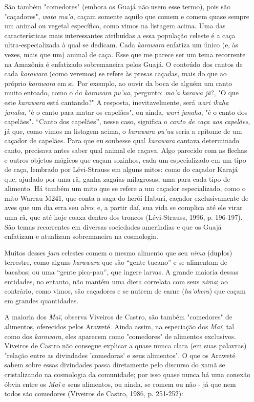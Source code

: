 São também "comedores" (embora os Guajá não usem esse termo), pois são
"caçadores", \emph{wata ma'a}, caçam somente aquilo que comem e comem
quase sempre um animal ou vegetal específico, como vimos na listagem
acima. Uma das características mais interessantes atribuídas a essa
população celeste é a caça ultra-especializada à qual se dedicam. Cada
\emph{karawara} enfatiza um único (e, às vezes, mais que um) animal de
caça. Esse que me parece ser um tema recorrente na Amazônia é enfatizado
sobremaneira pelos Guajá. O conteúdo dos cantos de cada \emph{karawara}
(como veremos) se refere às presas caçadas, mais do que ao próprio
\emph{karawara} em si. Por exemplo, ao ouvir da boca de alguém um canto
muito entoado, como o do \emph{karawara} \emph{pu'ua}, pergunto:
\emph{ma'a karawa} \emph{jã}?, "O que este \emph{karawara} está
cantando?" A resposta, inevitavelmente, será \emph{wari ikaha}
\emph{janaha}, "é o canto para matar os capelães", ou ainda, \emph{wari}
\emph{janaha}, "é o canto dos capelães". ``Canto dos capelães'', nesse
caso, significa o \emph{canto de caça aos capelães}, já que, como vimos
na listagem acima, o \emph{karawara} \emph{pu'ua} seria a epítome de um
caçador de capelães. Para que eu soubesse qual \emph{karawara} cantava
determinado canto, precisava antes saber qual animal ele caçava. Algo
parecido com as flechas e outros objetos mágicos que caçam sozinhos,
cada um especializado em um tipo de caça, lembrado por Lévi-Strauss em
alguns mitos: como do caçador Karajá que, ajudado por uma rã, ganha
zagaias milagrosas, uma para cada tipo de alimento. Há também um mito
que se refere a um caçador especializado, como o mito Warrau M241, que
conta a saga do herói Haburi, caçador exclusivamente de aves que um dia
erra seu alvo; e, a partir daí, sua vida se complica até ele virar uma
rã, que até hoje coaxa dentro dos troncos (Lévi-Strauss, 1996, p.
196-197). São temas recorrentes em diversas sociedades ameríndias e que
os Guajá enfatizam e atualizam sobremaneira na cosmologia.

Muitos desses \emph{jara} celestes comem o mesmo alimento que seu
\emph{nima} (duplos) terrestre, como alguns \emph{karawara} que são
``gente tucano'' e se alimentam de bacabas; ou uma ``gente pica-pau'',
que ingere larvas. A grande maioria dessas entidades, no entanto, não
mantém uma dieta correlata com seus \emph{nima}; ao contrário, como
vimos, são caçadores e se nutrem de carne (\emph{ha'okera}) que caçam em
grandes quantidades.

A maioria dos \emph{Maï}, observa Viveiros de Castro, são também
"comedores" de alimentos, oferecidos pelos Araweté. Ainda assim, na
especiação dos \emph{Maï}, tal como dos \emph{karawara}, eles aparecem
como "comedores" de alimentos exclusivos. Viveiros de Castro não
consegue explicar a quase nunca clara (em suas palavras) "relação entre
as divindades 'comedoras' e seus alimentos". O que os Araweté sabem
sobre essas divindades passa diretamente pelo discurso do xamã se
cristalizando na cosmologia da comunidade; por isso quase nunca há uma
conexão óbvia entre os \emph{Maï} e seus alimentos, ou ainda, se comem
ou não - já que nem todos são comedores (Viveiros de Castro, 1986, p.
251-252):


